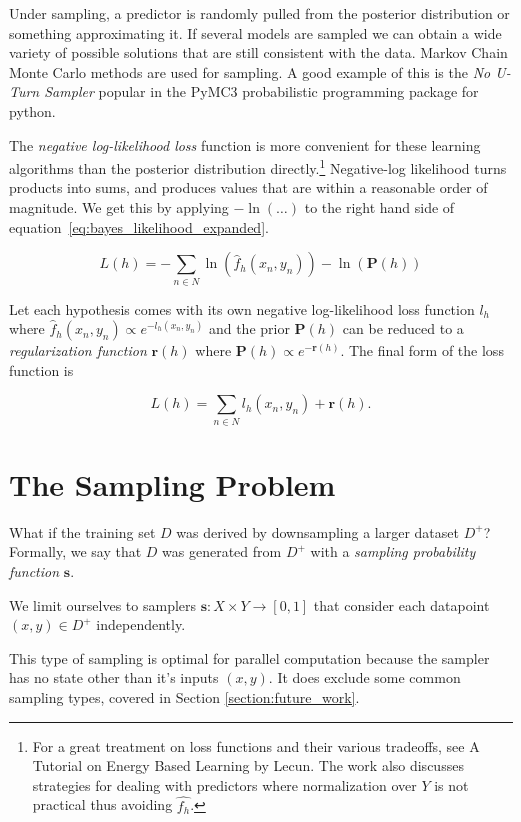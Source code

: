 \documentclass[twoside]{article}
\begin{document}
Under sampling, a predictor is randomly pulled from the posterior distribution or something approximating it. If several models are sampled we can obtain a wide variety of possible solutions that are still consistent with the data. Markov Chain Monte Carlo methods are used for sampling. A good example of this is the \textit{No U-Turn Sampler}\cite{gelman} popular in the PyMC3\cite{pymc3} probabilistic programming package for python.

The \textit{negative log-likelihood loss} function is more convenient for these learning algorithms than the posterior distribution directly.\footnote{For a great treatment on loss functions and their various tradeoffs, see A Tutorial on Energy Based Learning by Lecun\cite{lecun}. The work also discusses strategies for dealing with predictors where normalization over \(Y\) is not practical thus avoiding \(\hat{f_h}\).} Negative-log likelihood turns products into sums, and produces values that are within a reasonable order of magnitude. We get this by applying \(-\ln(\ldots)\) to the right hand side of equation~\eqref{eq:bayes_likelihood_expanded}.

\[L(h)=-\sum_{n \in N} \ln(\hat{f}_h(x_n,y_n))-\ln(\mathbf{P}(h))\]

Let each hypothesis comes with its own negative log-likelihood loss function \(l_h\) where \(\hat{f}_h(x_n,y_n)\propto e^{-l_h(x_n,y_n)}\) and the prior \(\mathbf{P}(h)\) can be reduced to a \textit{regularization function} \(\mathbf{r}(h)\) where \(\mathbf{P}(h)\propto e^{-\mathbf{r}(h)}\). The final form of the loss function is

\[L(h)=\sum_{n \in N} l_h(x_n,y_n)+\mathbf{r}(h).\]

\section{The Sampling Problem}
\label{section:problem}

What if the training set \(D\) was derived by downsampling a larger dataset \(D^+\)? Formally, we say that \(D\) was generated from \(D^+\) with a \textit{sampling probability function} \(\mathbf{s}\).

We limit ourselves to samplers \(\mathbf{s}: X \times Y \rightarrow \left [ 0, 1\right ]\) that consider each datapoint \((x, y) \in D^+\) independently.

This type of sampling is optimal for parallel computation because the sampler has no state other than it's inputs \((x, y)\). It does exclude some common sampling types, covered in Section \ref{section:future_work}.
\end{document}
